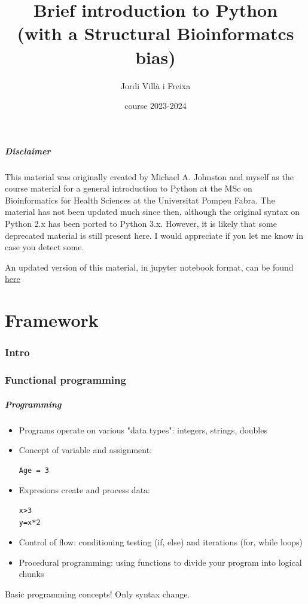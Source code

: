 \documentclass{beamer}
\title[Introduction]{Brief introduction to Python\\\small (with a Structural Bioinformatcs bias)} %
\author{Jordi Villà i Freixa} %
\institute[FCTE] %
{
Universitat de Vic - Universitat Central de Catalunya \\
Study Abroad\\ %
\medskip
\textit{jordi.villa@uvic.cat}\\ %
\copyright Michael A. Johnston 2007; JVF 2007-2023 
}
\date{course 2023-2024}
\begin{document}
\begin{frame}
  \titlepage %
\end{frame}

\begin{frame}
  \frametitle{Disclaimer}
  This material was originally created by Michael A. Johnston and myself as the course material for a general introduction to Python at the MSc on Bioinformatics for Health Sciences at the Universitat Pompeu Fabra. The material has not been updated much since then, although the original syntax on Python 2.x has been ported to Python 3.x. However, it is likely that some deprecated material is still present here. I would appreciate if you let me know in case you detect some. 

  An updated version of this material, in jupyter notebook format, can be found \href{https://compbiochbiophlab.github.io/Tools/pythonPrimer/BasicPythonIntro.html}{here}
\end{frame}


\part{Framework}
\begin{frame}
\tableofcontents
\end{frame}

\section{Intro}
\section{Functional programming}

\begin{frame}[containsverbatim]
\frametitle{Programming}
\begin{itemize}
\item Programs operate on various "data types": integers, strings, doubles
\item Concept of variable and assignment: 
\begin{lstlisting}
Age = 3
\end{lstlisting}
\item Expresions create and process data:
\begin{lstlisting}
x>3
y=x*2
\end{lstlisting}
\item Control of flow: conditioning testing (if, else) and iterations (for, while loops)
\item Procedural programming: using functions to divide your program into logical chunks
\end{itemize}
Basic programming concepts! Only syntax change.
\end{frame}
\end{document}
